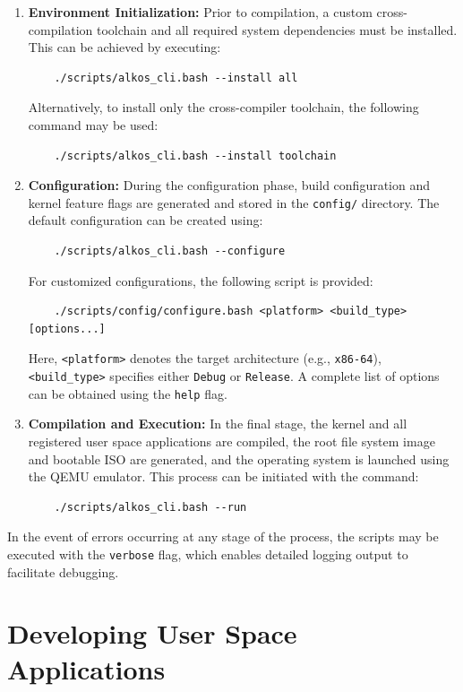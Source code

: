 \documentclass[a4paper,10pt,twoside]{report}
\theoremstyle{definition}
\begin{document}
\begin{enumerate}
    \item \textbf{Environment Initialization:}
    Prior to compilation, a custom cross-compilation toolchain and all required system dependencies must be installed. This can be achieved by executing:
    \begin{verbatim}
    ./scripts/alkos_cli.bash --install all
    \end{verbatim}
    Alternatively, to install only the cross-compiler toolchain, the following command may be used:
    \begin{verbatim}
    ./scripts/alkos_cli.bash --install toolchain
    \end{verbatim}

    \item \textbf{Configuration:}
    During the configuration phase, build configuration and kernel feature flags are generated and stored in the \texttt{config/} directory. The default configuration can be created using:
    \begin{verbatim}
    ./scripts/alkos_cli.bash --configure
    \end{verbatim}
    For customized configurations, the following script is provided:
    \begin{verbatim}
    ./scripts/config/configure.bash <platform> <build_type> [options...]
    \end{verbatim}
    Here, \texttt{<platform>} denotes the target architecture (e.g., \texttt{x86-64}), \texttt{<build\_type>} specifies either \texttt{Debug} or \texttt{Release}. A complete list of options can be obtained using the \texttt{\text{-}\text{-}help} flag.

    \item \textbf{Compilation and Execution:}
    In the final stage, the kernel and all registered user space applications are compiled, the root file system image and bootable ISO are generated, and the operating system is launched using the QEMU emulator. This process can be initiated with the command:
    \begin{verbatim}
    ./scripts/alkos_cli.bash --run
    \end{verbatim}
\end{enumerate}

In the event of errors occurring at any stage of the process, the scripts may be executed with the \texttt{\text{-}\text{-}verbose} flag, which enables detailed logging output to facilitate debugging.

\section{Developing User Space Applications}
\end{document}
